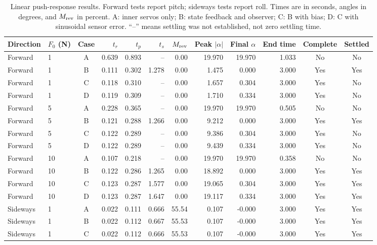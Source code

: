 \begin{table}[!t]
\centering\footnotesize
\caption{Linear push-response results. Forward tests report pitch; sideways tests report roll. Times are in seconds, angles in degrees, and $M_{\rm rev}$ in percent. A: inner servos only; B: state feedback and observer; C: B with bias; D: C with sinusoidal sensor error. ``--'' means settling was not established, not zero settling time.}
\label{tab:push_linear}
\setlength{\tabcolsep}{5pt}
\begin{tabular}{@{}llcrrrrrrrcc@{}}
\toprule
Direction & $F_0$ (N) & Case & $t_r$ & $t_p$ & $t_s$ & $M_{\rm rev}$ & Peak $|\alpha|$ & Final $\alpha$ & End time & Complete & Settled\\
\midrule
Forward & 1 & A & 0.639 & 0.893 & -- & 0.00 & 19.970 & 19.970 & 1.033 & No & No\\
Forward & 1 & B & 0.111 & 0.302 & 1.278 & 0.00 & 1.475 & 0.000 & 3.000 & Yes & Yes\\
Forward & 1 & C & 0.118 & 0.310 & -- & 0.00 & 1.657 & 0.304 & 3.000 & Yes & No\\
Forward & 1 & D & 0.119 & 0.309 & -- & 0.00 & 1.710 & 0.334 & 3.000 & Yes & No\\
\midrule
Forward & 5 & A & 0.228 & 0.365 & -- & 0.00 & 19.970 & 19.970 & 0.505 & No & No\\
Forward & 5 & B & 0.121 & 0.288 & 1.266 & 0.00 & 9.212 & 0.000 & 3.000 & Yes & Yes\\
Forward & 5 & C & 0.122 & 0.289 & -- & 0.00 & 9.386 & 0.304 & 3.000 & Yes & No\\
Forward & 5 & D & 0.122 & 0.289 & -- & 0.00 & 9.439 & 0.334 & 3.000 & Yes & No\\
\midrule
Forward & 10 & A & 0.107 & 0.218 & -- & 0.00 & 19.970 & 19.970 & 0.358 & No & No\\
Forward & 10 & B & 0.122 & 0.286 & 1.265 & 0.00 & 18.892 & 0.000 & 3.000 & Yes & Yes\\
Forward & 10 & C & 0.123 & 0.287 & 1.577 & 0.00 & 19.065 & 0.304 & 3.000 & Yes & Yes\\
Forward & 10 & D & 0.123 & 0.287 & 1.647 & 0.00 & 19.117 & 0.334 & 3.000 & Yes & Yes\\
\midrule
Sideways & 1 & A & 0.022 & 0.111 & 0.666 & 55.54 & 0.107 & -0.000 & 3.000 & Yes & Yes\\
Sideways & 1 & B & 0.022 & 0.112 & 0.667 & 55.53 & 0.107 & -0.000 & 3.000 & Yes & Yes\\
Sideways & 1 & C & 0.022 & 0.112 & 0.666 & 55.53 & 0.107 & -0.000 & 3.000 & Yes & Yes\\

\end{tabular}
\end{table}
